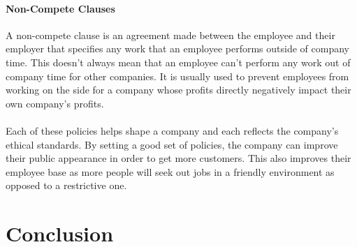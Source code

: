\documentclass[a4paper,12pt]{article}
\begin{document}
\paragraph{Non-Compete Clauses}A non-compete clause is an agreement made between the employee and their employer that specifies any work that an employee performs outside of company time. This doesn't always mean that an employee can't perform any work out of company time for other companies. It is usually used to prevent employees from working on the side for a company whose profits directly negatively impact their own company's profits.
\paragraph{}Each of these policies helps shape a company and each reflects the company's ethical standards. By setting a good set of policies, the company can improve their public appearance in order to get more customers. This also improves their employee base as more people will seek out jobs in a friendly environment as opposed to a restrictive one.

\section*{Conclusion}
\end{document}

